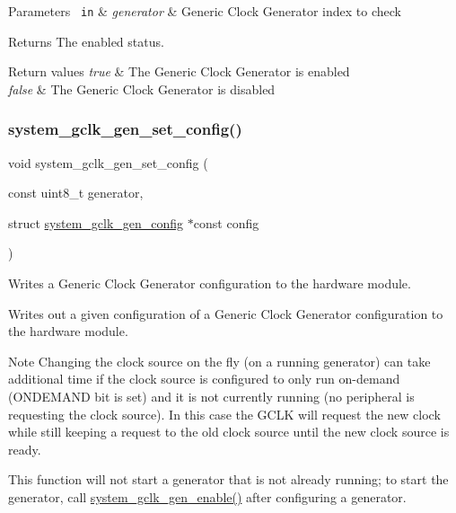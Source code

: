\begin{DoxyParams}[1]{Parameters}
\mbox{\texttt{ in}}  & {\em generator} & Generic Clock Generator index to check\\
\hline
\end{DoxyParams}
\begin{DoxyReturn}{Returns}
The enabled status. 
\end{DoxyReturn}

\begin{DoxyRetVals}{Return values}
{\em true} & The Generic Clock Generator is enabled \\
\hline
{\em false} & The Generic Clock Generator is disabled \\
\hline
\end{DoxyRetVals}
\mbox{\label{group__asfdoc__sam0__system__clock__group_gacfd3360ccc8abb013f66b11ff44a5d0d}} 
\subsubsection{\texorpdfstring{system\_gclk\_gen\_set\_config()}{system\_gclk\_gen\_set\_config()}}
{\footnotesize\ttfamily void system\+\_\+gclk\+\_\+gen\+\_\+set\+\_\+config (\begin{DoxyParamCaption}\item[{const uint8\+\_\+t}]{generator,  }\item[{struct \mbox{\hyperlink{structsystem__gclk__gen__config}{system\+\_\+gclk\+\_\+gen\+\_\+config}} $\ast$const}]{config }\end{DoxyParamCaption})}



Writes a Generic Clock Generator configuration to the hardware module. 

Writes out a given configuration of a Generic Clock Generator configuration to the hardware module.

\begin{DoxyNote}{Note}
Changing the clock source on the fly (on a running generator) can take additional time if the clock source is configured to only run on-\/demand (O\+N\+D\+E\+M\+A\+ND bit is set) and it is not currently running (no peripheral is requesting the clock source). In this case the G\+C\+LK will request the new clock while still keeping a request to the old clock source until the new clock source is ready.

This function will not start a generator that is not already running; to start the generator, call \mbox{\hyperlink{group__asfdoc__sam0__system__clock__group_ga2bad007fcf1f649a3919dcc72dccea8b}{system\+\_\+gclk\+\_\+gen\+\_\+enable()}} after configuring a generator.
\end{DoxyNote}

